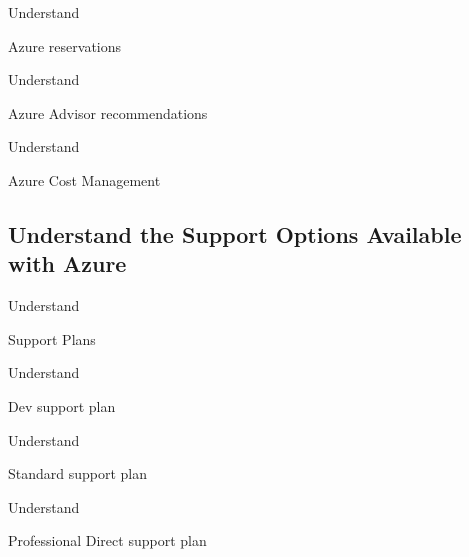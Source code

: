 \documentclass{scrartcl}
\newenvironment{flashcard}[2][]{%
    #1
    \vfill
    \centerline{\Large{#2}}
    \vfill
    \newpage
}
{\newpage}
\newcommand{\subsectioncard}[1]{
    \vspace*{\stretch{1}}
    \subsection{#1}
    \vspace*{\stretch{1}}
    \pagebreak
}
\begin{document}
    \begin{flashcard}[Understand]{Azure reservations}

    \end{flashcard}

    \begin{flashcard}[Understand]{Azure Advisor recommendations}

    \end{flashcard}

    \begin{flashcard}[Understand]{Azure Cost Management}

    \end{flashcard}

    \subsectioncard{Understand the Support Options Available with Azure}

    \begin{flashcard}[Understand]{Support Plans}

    \end{flashcard}

    \begin{flashcard}[Understand]{Dev support plan}

    \end{flashcard}

    \begin{flashcard}[Understand]{Standard support plan}

    \end{flashcard}

    \begin{flashcard}[Understand]{Professional Direct support plan}

    \end{flashcard}
\end{document}
